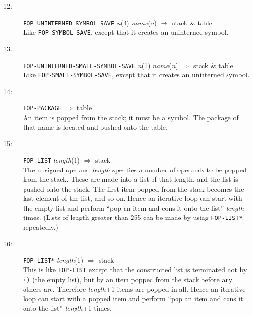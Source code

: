 \begin{description}
\item[12:] \hspace{2em} {\tt FOP-UNINTERNED-SYMBOL-SAVE} \hspace{2em} {\it n}(4) \hspace{2em} {\it name}({\it n})
\hspace{2em} $\Rightarrow$ \hspace{2em} stack \& table\\
Like {\tt FOP-SYMBOL-SAVE}, except that it creates an uninterned symbol.

\item[13:] \hspace{2em} {\tt FOP-UNINTERNED-SMALL-SYMBOL-SAVE} \hspace{2em} {\it n}(1)
\hspace{2em} {\it name}({\it n}) \hspace{2em} $\Rightarrow$ \hspace{2em} stack
\& table\\
Like {\tt FOP-SMALL-SYMBOL-SAVE}, except that it creates an uninterned symbol.

\item[14:] \hspace{2em} {\tt FOP-PACKAGE} \hspace{2em} $\Rightarrow$ \hspace{2em} table \\
An item is popped from the stack; it must be a symbol.	The package of
that name is located and pushed onto the table.

\item[15:] \hspace{2em} {\tt FOP-LIST} \hspace{2em} {\it length}(1) \hspace{2em} $\Rightarrow$ \hspace{2em} stack \\
The unsigned operand {\it length} specifies a number of
operands to be popped from the stack.  These are made into a list
of that length, and the list is pushed onto the stack.
The first item popped from the stack becomes the last element of
the list, and so on.  Hence an iterative loop can start with
the empty list and perform ``pop an item and cons it onto the list''
{\it length} times.
(Lists of length greater than 255 can be made by using {\tt FOP-LIST*}
repeatedly.)

\item[16:] \hspace{2em} {\tt FOP-LIST*} \hspace{2em} {\it length}(1) \hspace{2em} $\Rightarrow$ \hspace{2em} stack \\
This is like {\tt FOP-LIST} except that the constructed list is terminated
not by {\tt ()} (the empty list), but by an item popped from the stack
before any others are.	Therefore {\it length}+1 items are popped in all.
Hence an iterative loop can start with
a popped item and perform ``pop an item and cons it onto the list''
{\it length}+1 times.


\end{description}
